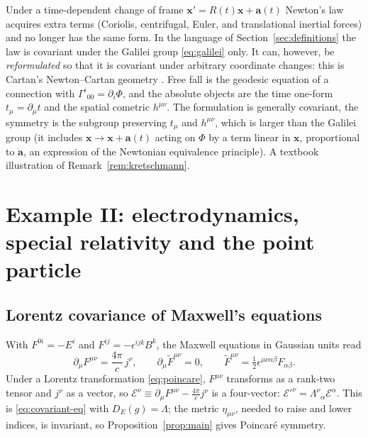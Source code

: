 \documentclass[11pt,a4paper,openany]{book}
\theoremstyle{definition}
\theoremstyle{plain}
\theoremstyle{remark}
\newcommand{\vx}{\bm{x}}
\begin{document}
Under a time-dependent change of frame $\vx'=R(t)\vx+\bm a(t)$ Newton's law
acquires extra terms (Coriolis, centrifugal, Euler, and translational
inertial forces) and no longer has the same form. In the language of
Section~\ref{sec:definitions} the law is covariant under the Galilei group
\eqref{eq:galilei} only. It can, however, be \emph{reformulated} so that it is
covariant under arbitrary coordinate changes: this is Cartan's
Newton--Cartan geometry \cite{cartan,dbkp}. Free fall is the geodesic equation
of a connection with $\Gamma^i{}_{00}=\partial_i\Phi$, and the absolute
objects are the time one-form $t_\mu=\partial_\mu t$ and the spatial
cometric $h^{\mu\nu}$. The formulation is generally covariant, the symmetry
is the subgroup preserving $t_\mu$ and $h^{\mu\nu}$, which is larger than the
Galilei group (it includes $\vx\to\vx+\bm a(t)$ acting on $\Phi$ by a term
linear in $\vx$, proportional to $\ddot{\bm a}$, an expression of the
Newtonian equivalence principle). A textbook illustration of
Remark~\ref{rem:kretschmann}.

\section{Example II: electrodynamics, special relativity and the point particle}
\label{sec:sr}

\subsection{Lorentz covariance of Maxwell's equations}

With $F^{0i}=-E^i$ and $F^{ij}=-\epsilon^{ijk}B^k$, the Maxwell equations in
Gaussian units read
\begin{equation}\label{eq:maxwell}
  \partial_\mu F^{\mu\nu}=\frac{4\pi}{c}\,j^\nu,\qquad
  \partial_\mu\tilde F^{\mu\nu}=0,\qquad
  \tilde F^{\mu\nu}=\tfrac12\epsilon^{\mu\nu\alpha\beta}F_{\alpha\beta}.
\end{equation}
Under a Lorentz transformation \eqref{eq:poincare}, $F^{\mu\nu}$ transforms as a
rank-two tensor and $j^\nu$ as a vector, so
$\mathcal E^\nu\equiv\partial_\mu F^{\mu\nu}-\tfrac{4\pi}{c}j^\nu$ is a
four-vector: $\mathcal E'^\nu=\Lambda^\nu{}_\alpha\mathcal E^\alpha$. This is
\eqref{eq:covariant-eq} with $D_E(g)=\Lambda$; the metric $\eta_{\mu\nu}$,
needed to raise and lower indices, is invariant, so Proposition~\ref{prop:main}
gives Poincar\'e symmetry.
\end{document}
